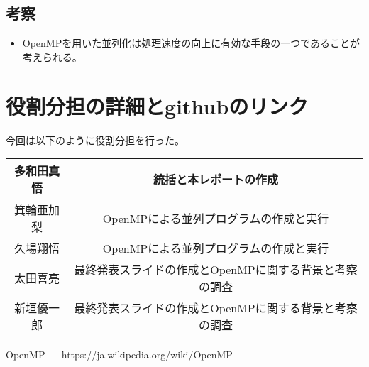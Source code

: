 \documentclass[twocolumn,11pt]{jarticle} %
\begin{document}
\subsection{考察}
\begin{itemize}
    \item OpenMPを用いた並列化は処理速度の向上に有効な手段の一つであることが考えられる。
\end{itemize}

\section{役割分担の詳細とgithubのリンク}
今回は以下のように役割分担を行った。

\begin{table}[h]
    \scriptsize
    \begin{tabular}{|c|c|}
    \hline
    多和田真悟 & 統括と本レポートの作成 \\ \hline
    箕輪亜加梨 & OpenMPによる並列プログラムの作成と実行 \\ \hline
    久場翔悟 & OpenMPによる並列プログラムの作成と実行 \\ \hline
    太田喜亮 & 最終発表スライドの作成とOpenMPに関する背景と考察の調査 \\ \hline
    新垣優一郎 & 最終発表スライドの作成とOpenMPに関する背景と考察の調査 \\ \hline
    \end{tabular}
\end{table}

\begin{thebibliography}{9}
	 OpenMP --- https://ja.wikipedia.org/wiki/OpenMP
\end{thebibliography}
\end{document}
